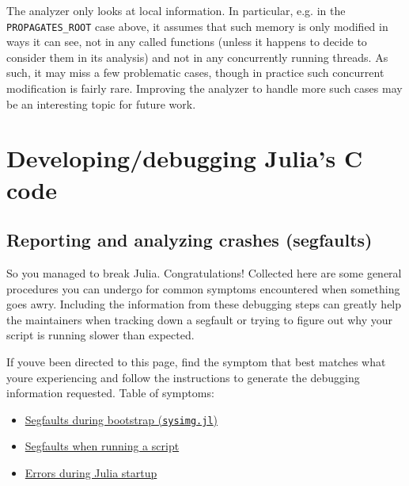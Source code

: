 The analyzer only looks at local information. In particular, e.g. in the \texttt{PROPAGATES\_ROOT} case above, it assumes that such memory is only modified in ways it can see, not in any called functions (unless it happens to decide to consider them in its analysis) and not in any concurrently running threads. As such, it may miss a few problematic cases, though in practice such concurrent modification is fairly rare. Improving the analyzer to handle more such cases may be an interesting topic for future work.



\chapter{Developing/debugging Julia's C code}


\hypertarget{11376306494480499528}{}


\section{Reporting and analyzing crashes (segfaults)}



So you managed to break Julia.  Congratulations!  Collected here are some general procedures you can undergo for common symptoms encountered when something goes awry.  Including the information from these debugging steps can greatly help the maintainers when tracking down a segfault or trying to figure out why your script is running slower than expected.



If you{\textquotesingle}ve been directed to this page, find the symptom that best matches what you{\textquotesingle}re experiencing and follow the instructions to generate the debugging information requested.  Table of symptoms:



\begin{itemize}
\item \hyperlink{13671941627037387928}{Segfaults during bootstrap (\texttt{sysimg.jl})}


\item \hyperlink{17238593239204343556}{Segfaults when running a script}


\item \hyperlink{15906783386188107842}{Errors during Julia startup}

\end{itemize}


